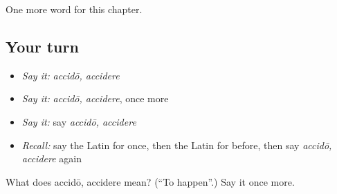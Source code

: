 \begin{grammarlens}[title={What you've built}]
One more word for this chapter.
\end{grammarlens}

\subsection*{Your turn}
\begin{itemize}
\raggedright
  \item \emph{Say it:} \emph{accidō, accidere}
  \item \emph{Say it:} \emph{accidō, accidere}, once more
  \item \emph{Say it:} say \emph{accidō, accidere}
  \item \emph{Recall:} say the Latin for once, then the Latin for before, then say \emph{accidō, accidere} again
\end{itemize}

\begin{tcolorbox}[breakable,colback=teal!4,colframe=teal!35!black,title={Before you move on}]
What does accidō, accidere mean? (\textquotedblleft{}To happen\textquotedblright{}.) Say it once more.
\end{tcolorbox}
